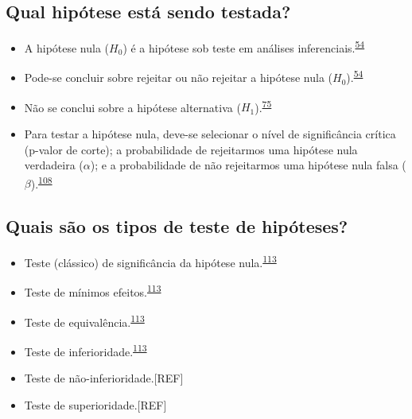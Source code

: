 \documentclass[
  a4paper,
]{book}
\begin{document}
\hypertarget{qual-hipuxf3tese-estuxe1-sendo-testada}{%
\subsection{Qual hipótese está sendo testada?}\label{qual-hipuxf3tese-estuxe1-sendo-testada}}

\begin{itemize}
\item
  A hipótese nula (\(H_{0}\)) é a hipótese sob teste em análises inferenciais.\textsuperscript{\protect\hyperlink{ref-Ali2016}{54}}
\item
  Pode-se concluir sobre rejeitar ou não rejeitar a hipótese nula (\(H_{0}\)).\textsuperscript{\protect\hyperlink{ref-Ali2016}{54}}
\item
  Não se conclui sobre a hipótese alternativa (\(H_{1}\)).\textsuperscript{\protect\hyperlink{ref-kanji2006}{75}}
\item
  Para testar a hipótese nula, deve-se selecionar o nível de significância crítica (p-valor de corte); a probabilidade de rejeitarmos uma hipótese nula verdadeira (\(\alpha\)); e a probabilidade de não rejeitarmos uma hipótese nula falsa (\(\beta\)).\textsuperscript{\protect\hyperlink{ref-Curran-Everett2009}{108}}
\end{itemize}

\hypertarget{quais-suxe3o-os-tipos-de-teste-de-hipuxf3teses}{%
\subsection{Quais são os tipos de teste de hipóteses?}\label{quais-suxe3o-os-tipos-de-teste-de-hipuxf3teses}}

\begin{itemize}
\item
  Teste (clássico) de significância da hipótese nula.\textsuperscript{\protect\hyperlink{ref-lakens2018}{113}}
\item
  Teste de mínimos efeitos.\textsuperscript{\protect\hyperlink{ref-lakens2018}{113}}
\item
  Teste de equivalência.\textsuperscript{\protect\hyperlink{ref-lakens2018}{113}}
\item
  Teste de inferioridade.\textsuperscript{\protect\hyperlink{ref-lakens2018}{113}}
\item
  Teste de não-inferioridade.{[}REF{]}
\item
  Teste de superioridade.{[}REF{]}
\end{itemize}
\end{document}
